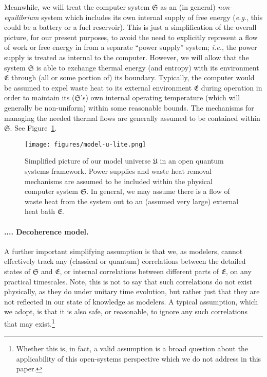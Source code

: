 \documentclass[preprints,article,accept,moreauthors,pdftex]{Definitions/mdpi}
\newcommand{\mypara}[1]{\paragraph{\arabic{section}.\arabic{subsection}.\arabic{subsubsection}.\arabic{paragraph}. #1}}
\begin{document}
Meanwhile, we will treat the computer system $\mathfrak{S}$ as an (in general) \emph{non-equilibrium} system which includes its own internal supply of free energy (\emph{e.g.}, this could be a battery or a fuel reservoir). This is just a simplification of the overall picture, for our present purposes, to avoid the need to explicitly represent a flow of work or free energy in from a separate ``power supply'' system; \emph{i.e.}, the power supply is treated as internal to the computer.
However, we will allow that the system $\mathfrak{S}$ is able to exchange thermal energy (and entropy) with its environment $\mathfrak{E}$ through (all or some portion of) its boundary. Typically, the computer would be assumed to expel waste heat to its external environment $\mathfrak{E}$ during operation in order to maintain its ($\mathfrak{S}$'s) own internal operating temperature (which will generally be non-uniform) within some reasonable bounds. The mechanisms for managing the needed thermal flows are generally assumed to be contained within $\mathfrak{S}$. See Figure~\ref{fig:model-u}.

\begin{figure}[t] %
\centerline{\texttt{[image: figures/model-u-lite.png]}}
\caption{Simplified picture of our model universe $\mathfrak{U}$ in an open quantum systems framework. Power supplies and waste heat removal mechanisms are assumed to be included within the physical computer system $\mathfrak{S}$. In general, we may assume there is a flow of waste heat from the system out to an (assumed very large) external heat bath $\mathfrak{E}$.\label{fig:model-u}}
\end{figure}   

\mypara{Decoherence model.}\label{par:decoher}
A further important simplifying assumption is that we, as modelers, cannot effectively track any (classical or quantum) correlations between the detailed states of $\mathfrak{S}$ and $\mathfrak{E}$, or internal correlations between different parts of $\mathfrak{E}$, on any practical timescales. Note, this is not to say that such correlations do not exist physically, as they do under unitary time evolution, but rather just that they are not reflected in our state of knowledge as modelers. A typical assumption, which we adopt, is that it is also safe, or reasonable, to ignore any such correlations that may exist.\footnote{Whether this is, in fact, a valid assumption is a broad question about the applicability of this open-systems perspective which we do not address in this paper.}
\end{document}
